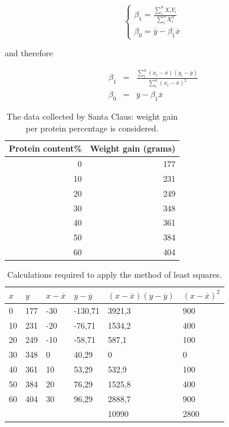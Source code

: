 \begin{theorem}
  \begin{equation}
    \begin{cases}
      \beta_{1} = \frac{\sum_{i}^{n} X_{i}Y_{i}}{\sum_{i}^{n} X_{i}^{2}}\\
      \beta_{0} = \overline{y} - \beta_{1}\overline{x}
    \end{cases}
    \label{eq:vgl2}
  \end{equation}

  and therefore

  \begin{eqnarray}
    \beta_{1} & = & \frac{\sum_{i}^{n} (x_{i} - \overline{x})(y_{i} - \overline{y})}{\sum_{i}^{n} (x_{i} - \overline{x})^{2}} \\
    \beta_{0} & = & \overline{y} - \beta_{1} \overline{x}
    \label{eq:regressie}
  \end{eqnarray}
\end{theorem}


\begin{table} \centering
  \begin{tabular}{@{}rr@{}} \toprule
    Protein content\%& Weight gain (grams)  \\
    \midrule
    0		&	177 \\
    10 	&	231	\\
    20	& 249	\\
    30	& 348 \\
    40	& 361 \\
    50	& 384 \\
    60	& 404 \\
    \bottomrule
  \end{tabular}
  \caption{The data collected by Santa Claus: weight gain per protein percentage is considered.}
  \label{tab:reindeer}
\end{table}



\begin{table} \centering
  \begin{tabular}{@{}llllll@{}}
    \toprule
    $x$   & $y$     & $x-\overline{x}$    & $y - \overline{y}$        & $(x-\overline{x})(y - \overline{y})$       &  $(x-\overline{x})^{2}$    \\ \midrule
    0  & 177 & -30 & -130,71 & 3921,3 & 900  \\
    10 & 231 & -20 & -76,71  & 1534,2 & 400  \\
    20 & 249 & -10 & -58,71  & 587,1  & 100  \\
    30 & 348 & 0   & 40,29   & 0      & 0    \\
    40 & 361 & 10  & 53,29   & 532,9  & 100  \\
    50 & 384 & 20  & 76,29   & 1525,8 & 400  \\
    60 & 404 & 30  & 96,29   & 2888,7 & 900  \\
    &     &     &         & 10990  & 2800 \\ \bottomrule
  \end{tabular}
  \caption{Calculations required to apply the method of least squares.}
  \label{tab:reindeer2}
\end{table}

